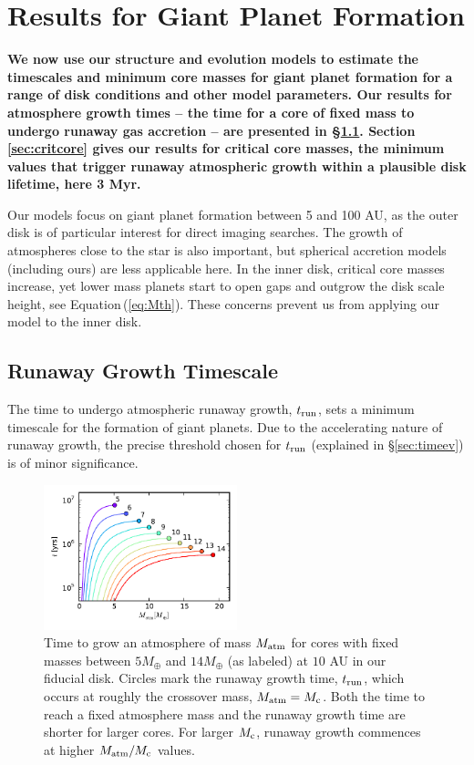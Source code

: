 \documentclass[apj, numberedappendix]{emulateapj}
\newcommand{\Eq}[1]{Equation\,(\ref{#1})}
\newcommand{\co}{_{\rm c}}
\begin{document}
\section{Results for Giant Planet Formation}
\label{sec:critical}

\textbf{We now use our structure and evolution models to estimate the timescales and minimum core masses for giant planet formation for a range of disk conditions and other model parameters.  Our results for atmosphere growth times -- the time for a core of fixed mass to undergo runaway gas accretion -- are presented in \S\ref{sec:tcross}.  Section \ref{sec:critcore} gives our results for critical core masses, the minimum values that trigger runaway atmospheric growth within a plausible disk lifetime, here 3 Myr.}

Our models focus on giant planet formation between 5 and 100 AU, as the outer disk is of particular interest for direct imaging searches.   The growth of atmospheres close to the star is also important, but spherical accretion models (including ours) are less applicable here.  In the inner disk, critical core masses increase, yet lower mass planets start to open gaps and outgrow the disk scale height, see \Eq{eq:Mth}.  These concerns prevent us from applying our model to the inner disk. 


\subsection{Runaway Growth Timescale}
\label{sec:tcross}
The time to undergo atmospheric runaway growth, $t_{\rm run}$, sets a minimum timescale for the formation of giant planets.  Due to the accelerating nature of runaway growth, the precise threshold chosen for $t_{\rm run}$ (explained in \S\ref{sec:timeev}) is of minor significance.

\begin{figure}[tb]
\hspace{-.1in}
\includegraphics[width=0.5\textwidth]{cumul_coolingtime_vs_Matm_10au_mu235.pdf}
\caption{Time to grow an atmosphere of mass $M_{\rm{atm}}$ for cores with fixed masses between $5 M_{\oplus}$ and $14 M_{\oplus}$ (as labeled) at $10$ AU in our fiducial disk. Circles mark the runaway growth time, $t_{\rm run}$, which occurs at roughly the crossover mass, $M_{\rm{atm}} = M\co$.  Both the time to reach a fixed atmosphere mass and the runaway growth time are shorter for larger cores. For larger $M\co$, runaway growth commences at higher $M_{\rm atm}/M\co$ values.}
\label{fig:tvsM}
\end{figure}
\end{document}
